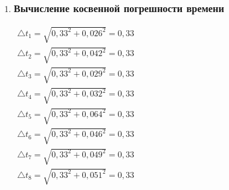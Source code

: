 \begin{enumerate}
		\item \subsubsection*{Вычисление косвенной погрешности времени}
		\label{appendix: 7}
		\begin{multicols}{2}
			\(\begin{aligned}\triangle t_1 = \sqrt{0,33^2 + 0,026^2} = 0,33\end{aligned}\) \\
			\(\begin{aligned}\triangle t_2 = \sqrt{0,33^2 + 0,042^2} = 0,33\end{aligned}\) \\
			\(\begin{aligned}\triangle t_3 = \sqrt{0,33^2 + 0,029^2} = 0,33\end{aligned}\) \\
			\(\begin{aligned}\triangle t_4 = \sqrt{0,33^2 + 0,032^2} = 0,33\end{aligned}\) \\
			\(\begin{aligned}\triangle t_5 = \sqrt{0,33^2 + 0,064^2} = 0,33\end{aligned}\) \\
			\(\begin{aligned}\triangle t_6 = \sqrt{0,33^2 + 0,046^2} = 0,33\end{aligned}\) \\
			\(\begin{aligned}\triangle t_7 = \sqrt{0,33^2 + 0,049^2} = 0,33\end{aligned}\) \\
			\(\begin{aligned}\triangle t_8 = \sqrt{0,33^2 + 0,051^2} = 0,33\end{aligned}\) \\
		\end{multicols}
		

\end{enumerate}
